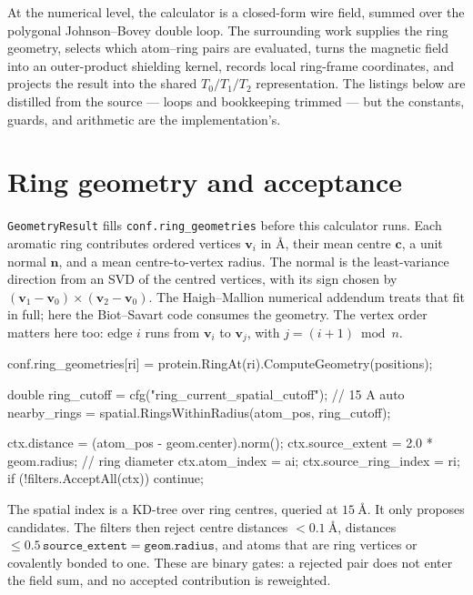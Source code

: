 \documentclass[11pt]{article}
\newcommand{\code}[1]{\texttt{#1}}
\begin{document}

At the numerical level, the calculator is a closed-form wire field, summed
over the polygonal Johnson--Bovey double loop. The surrounding work supplies the
ring geometry, selects which atom--ring pairs are evaluated, turns the magnetic
field into an outer-product shielding kernel, records local ring-frame
coordinates, and projects the result into the shared \(T_0/T_1/T_2\)
representation. The listings below are distilled from the source --- loops and
bookkeeping trimmed --- but the constants, guards, and arithmetic are the
implementation's.

\section{Ring geometry and acceptance}

\code{GeometryResult} fills \code{conf.ring\_geometries} before this calculator
runs. Each aromatic ring contributes ordered vertices \(\bm v_i\) in
\(\si{\angstrom}\), their mean centre \(\bm c\), a unit normal \(\bm n\), and a
mean centre-to-vertex radius. The normal is the least-variance direction from an
SVD of the centred vertices, with its sign chosen by
\((\bm v_1-\bm v_0)\times(\bm v_2-\bm v_0)\). The Haigh--Mallion numerical
addendum treats that fit in full; here the Biot--Savart code consumes the
geometry. The vertex order matters here too: edge \(i\) runs from \(\bm v_i\)
to \(\bm v_j\), with \(j=(i+1)\bmod n\).

\begin{codebox}
conf.ring_geometries[ri] =
    protein.RingAt(ri).ComputeGeometry(positions);

double ring_cutoff = cfg("ring_current_spatial_cutoff");  // 15 A
auto nearby_rings = spatial.RingsWithinRadius(atom_pos, ring_cutoff);

ctx.distance = (atom_pos - geom.center).norm();
ctx.source_extent = 2.0 * geom.radius;                    // ring diameter
ctx.atom_index = ai;
ctx.source_ring_index = ri;
if (!filters.AcceptAll(ctx)) continue;
\end{codebox}

The spatial index is a KD-tree over ring centres, queried at
\(\SI{15}{\angstrom}\). It only proposes candidates. The filters then reject
centre distances \(<\SI{0.1}{\angstrom}\), distances
\(\le 0.5\,\code{source\_extent}=\code{geom.radius}\), and atoms that are ring
vertices or covalently bonded to one. These are binary gates: a rejected pair
does not enter the field sum, and no accepted contribution is reweighted.
\end{document}
